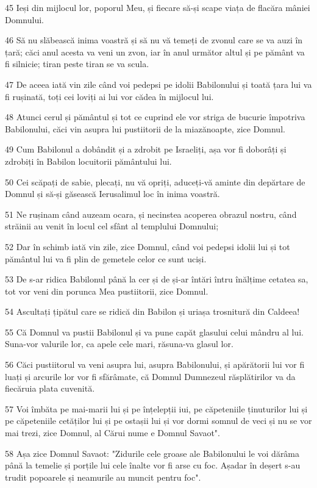 \par 45 Ieși din mijlocul lor, poporul Meu, și fiecare să-și scape viața de flacăra mâniei Domnului.
\par 46 Să nu slăbească inima voastră și să nu vă temeți de zvonul care se va auzi în țară; căci anul acesta va veni un zvon, iar în anul următor altul și pe pământ va fi silnicie; tiran peste tiran se va scula.
\par 47 De aceea iată vin zile când voi pedepsi pe idolii Babilonului și toată țara lui va fi rușinată, toți cei loviți ai lui vor cădea în mijlocul lui.
\par 48 Atunci cerul și pământul și tot ce cuprind ele vor striga de bucurie împotriva Babilonului, căci vin asupra lui pustiitorii de la miazănoapte, zice Domnul.
\par 49 Cum Babilonul a dobândit și a zdrobit pe Israeliți, așa vor fi doborâți și zdrobiți în Babilon locuitorii pământului lui.
\par 50 Cei scăpați de sabie, plecați, nu vă opriți, aduceți-vă aminte din depărtare de Domnul și să-și găsească Ierusalimul loc în inima voastră.
\par 51 Ne rușinam când auzeam ocara, și necinstea acoperea obrazul nostru, când străinii au venit în locul cel sfânt al templului Domnului;
\par 52 Dar în schimb iată vin zile, zice Domnul, când voi pedepsi idolii lui și tot pământul lui va fi plin de gemetele celor ce sunt uciși.
\par 53 De s-ar ridica Babilonul până la cer și de și-ar întări întru înălțime cetatea sa, tot vor veni din porunca Mea pustiitorii, zice Domnul.
\par 54 Ascultați țipătul care se ridică din Babilon și uriașa trosnitură din Caldeea!
\par 55 Că Domnul va pustii Babilonul și va pune capăt glasului celui mândru al lui. Suna-vor valurile lor, ca apele cele mari, răsuna-va glasul lor.
\par 56 Căci pustiitorul va veni asupra lui, asupra Babilonului, și apărătorii lui vor fi luați și arcurile lor vor fi sfărâmate, că Domnul Dumnezeul răsplătirilor va da fiecăruia plata cuvenită.
\par 57 Voi îmbăta pe mai-marii lui și pe înțelepții iui, pe căpeteniile ținuturilor lui și pe căpeteniile cetăților lui și pe ostașii lui și vor dormi somnul de veci și nu se vor mai trezi, zice Domnul, al Cărui nume e Domnul Savaot".
\par 58 Așa zice Domnul Savaot: "Zidurile cele groase ale Babilonului le voi dărâma până la temelie și porțile lui cele înalte vor fi arse cu foc. Așadar în deșert s-au trudit popoarele și neamurile au muncit pentru foc".
